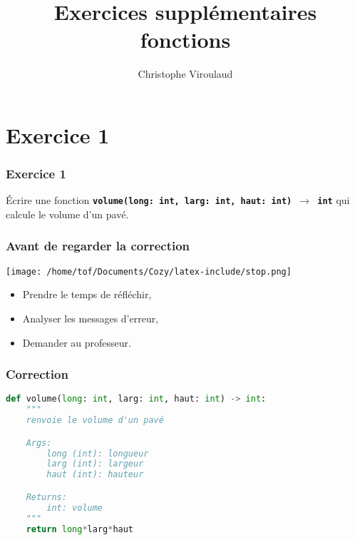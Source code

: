 \documentclass[svgnames,11pt]{beamer}
\author[]{Christophe Viroulaud}
\title{Exercices supplémentaires\\fonctions}
\date{\framebox{\textbf{Lang 07}}}
\institute{Première - NSI}
\begin{document}
\begin{frame}
\titlepage
\end{frame}
\section{Exercice 1}
\begin{frame}
    \frametitle{Exercice 1}

    Écrire une fonction \texttt{\textbf{volume(long: int, larg: int, haut: int) $\rightarrow$ int}} qui calcule le volume d'un pavé.

\end{frame}
\begin{frame}
    \frametitle{Avant de regarder la correction}
\begin{center}
    \centering
    \texttt{[image: /home/tof/Documents/Cozy/latex-include/stop.png]}
    \end{center}
{\Large
    \begin{itemize}
        \item Prendre le temps de réfléchir,
        \item Analyser les messages d'erreur,
        \item Demander au professeur.
    \end{itemize}
}
\end{frame}
\begin{frame}[fragile]
    \frametitle{Correction}

\begin{lstlisting}[language=Python , basicstyle=\ttfamily\small, xleftmargin=1em, xrightmargin=0em]
def volume(long: int, larg: int, haut: int) -> int:
    """
    renvoie le volume d'un pavé

    Args:
        long (int): longueur
        larg (int): largeur
        haut (int): hauteur

    Returns:
        int: volume
    """
    return long*larg*haut
\end{lstlisting}

\end{frame}
\end{document}
